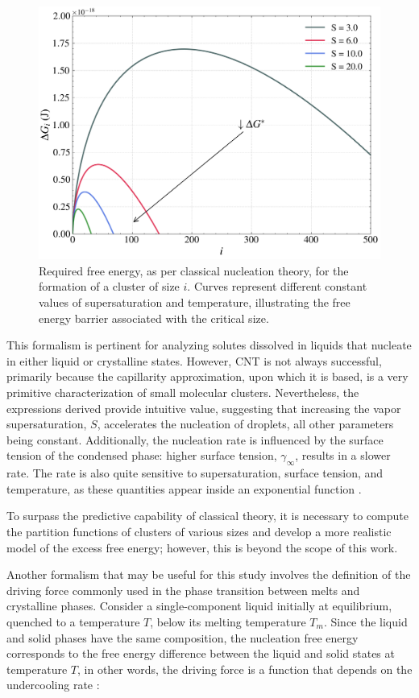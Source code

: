 \begin{figure}[H]
    \centering
    \includegraphics[width=0.9\linewidth]{free_energy_illustrative_degree_saturation.png}
    \caption{Required free energy, as per classical nucleation theory, for the formation of a cluster of size \(i\). Curves represent different constant values of supersaturation and temperature, illustrating the free energy barrier associated with the critical size.}
    \label{fig:free_energy_illustrative_degree_saturation}
\end{figure}

This formalism is pertinent for analyzing solutes dissolved in liquids that nucleate in either liquid or crystalline states. However, CNT is not always successful, primarily because the capillarity approximation, upon which it is based, is a very primitive characterization of small molecular clusters. Nevertheless, the expressions derived provide intuitive value, suggesting that increasing the vapor supersaturation, \(S\), accelerates the nucleation of droplets, all other parameters being constant. Additionally, the nucleation rate is influenced by the surface tension of the condensed phase: higher surface tension, \(\gamma_{\infty}\), results in a slower rate. The rate is also quite sensitive to supersaturation, surface tension, and temperature, as these quantities appear inside an exponential function \cite{Ford}.

To surpass the predictive capability of classical theory, it is necessary to compute the partition functions of clusters of various sizes and develop a more realistic model of the excess free energy; however, this is beyond the scope of this work.

Another formalism that may be useful for this study involves the definition of the driving force commonly used in the phase transition between melts and crystalline phases. Consider a single-component liquid initially at equilibrium, quenched to a temperature \(T\), below its melting temperature \(T_m\). Since the liquid and solid phases have the same composition, the nucleation free energy corresponds to the free energy difference between the liquid and solid states at temperature \(T\), in other words, the driving force is a function that depends on the undercooling rate \cite{Clouet1, Fokin2006}:

